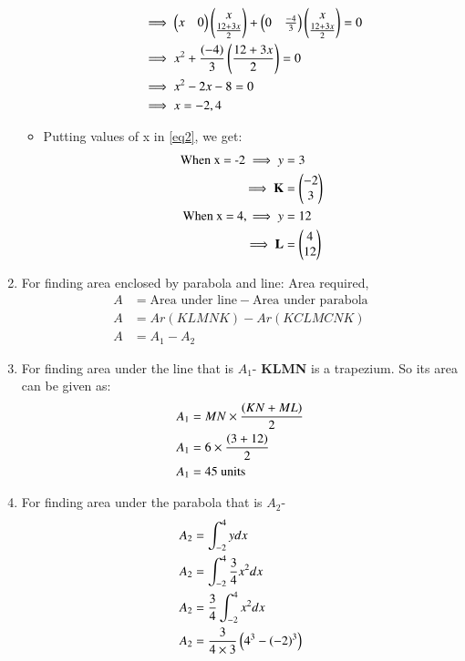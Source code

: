 \documentclass[journal,12pt,twocolumn]{IEEEtran}
\begin{document}
\begin{enumerate}
\begin{itemize}
\begin{align}
    \end{align}
    \begin{align}
    &\implies \begin{pmatrix}x&0\end{pmatrix}\begin{pmatrix}x\\\frac{12+3x}{2}\end{pmatrix}+\begin{pmatrix}0&\frac{-4}{3}\end{pmatrix}\begin{pmatrix}x\\\frac{12+3x}{2}\end{pmatrix}=0
    \\
    &\implies x^2+\frac{\left(-4\right)}{3}\left(\frac{12+3x}{2}\right)=0
    \\
    &\implies x^2-2x-8=0
    \\
    &\implies x=-2,4
\end{align}
\item Putting values of x in \eqref{eq2}, we get:
\begin{align}
\text{When x = -2}\implies y&=3
\\
\implies \mathbf{K}&= \begin{pmatrix}-2\\3\end{pmatrix}  
\\
\text{When x = 4},\implies y&=12
\\
\implies \mathbf{L}&= \begin{pmatrix}4\\12\end{pmatrix}
\end{align}
\end{itemize}
\item For finding area enclosed by parabola and line:
  Area required,
\begin{align}
   A&= \text{Area under line} - \text{Area under parabola}
     \\
   A&= Ar(KLMNK)-Ar(KCLMCNK)
    \\
    A&= A_1 -A_2 \label{eqAREA}
    \end{align}
\item For finding area under the line that is $A_1$-
\textbf{KLMN} is a trapezium. So its area can be given as:
\begin{align}
  A_1 &= MN\times\frac{\left(KN+ML\right)}{2} 
  \\
   A_1 &= 6\times\frac{\left(3+12\right)}{2} 
   \\
    A_1 &=45 \text{ units} \label{eqB}
\end{align}
\item For finding area under the parabola that is $A_2$-
\begin{align}
    A_2&= \int_{-2}^{4} y dx
    \\
    A_2&= \int_{-2}^{4} \frac{3}{4} x^2 dx
    \\
    A_2&= \frac{3}{4} \int_{-2}^{4}  x^2 dx
    \\
    A_2&= \frac{3}{4\times3} \brak{4^3-\brak{-2}^3}
    \\

\end{align}
\end{enumerate}
\end{document}

